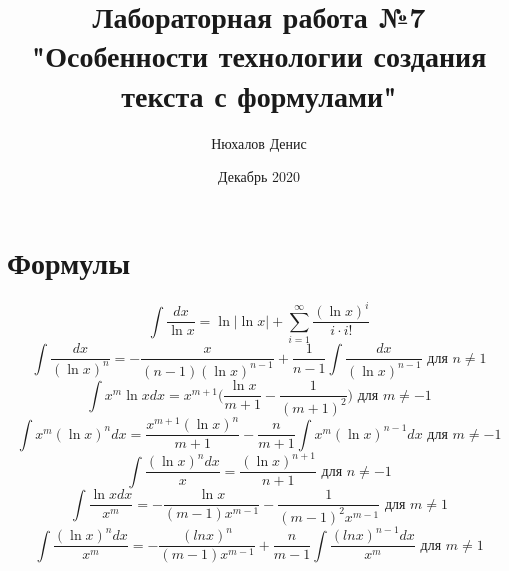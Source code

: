 \documentclass[a4paper,12pt]{article} %
\author{Нюхалов Денис}
\title{Лабораторная работа №7\\"Особенности технологии создания текста с формулами"}
\date{Декабрь 2020}
\begin{document}

\maketitle
\newpage
\section{Формулы}

\begin{equation}
\int \frac{dx}{\ln x}=\ln|\ln x|+\sum_{i=1}^\infty \frac{(\ln x)^i}{i\cdot i!}
\end{equation}
\begin{equation}
\int \frac{dx}{(\ln x)^n}=-\frac{x}{(n-1)(\ln x)^{n-1}}+\frac{1}{n-1}\int \frac{dx}{(\ln x)^{n-1}}\text{ для } n\neq 1
\end{equation}
\begin{equation}
\int x^m \ln x dx=x^{m+1}\Bigg( \frac{\ln x}{m+1}-\frac{1}{(m+1)^2}\Bigg) \text{ для } m \neq -1
\end{equation}
\begin{equation}
\int x^m(\ln x)^n dx=\frac{x^{m+1}(\ln x)^n}{m+1}-\frac{n}{m+1}\int x^m(\ln x)^{n-1}dx \text{ для } m \neq -1
\end{equation}
\begin{equation}
\int\frac{(\ln x)^n dx}{x}=\frac{(\ln x)^{n+1}}{n+1} \text{ для } n\neq -1
\end{equation}
\begin{equation}
\int \frac{\ln x dx}{x^m}=-\frac{\ln x}{(m-1)x^{m-1}}-\frac{1}{(m-1)^2 x^{m-1}} \text{ для } m \neq 1
\end{equation}
\begin{equation}
\int \frac{(\ln x)^n dx}{x^m}=-\frac{(ln x)^n}{(m-1)x^{m-1}}+\frac{n}{m-1}\int\frac{(ln x)^{n-1}dx}{x^m} \text{ для } m\neq 1 
\end{equation}
\end{document}
